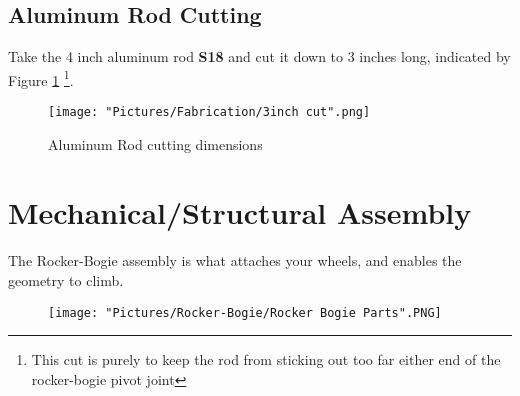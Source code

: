 \documentclass[12pt]{article}
\begin{document}
\subsection{Aluminum Rod Cutting}

Take the 4 inch aluminum rod \textbf{S18} and cut it down to 3 inches long, indicated by Figure \ref{rod cut} \footnote{This cut is purely to keep the rod from sticking out too far either end of the rocker-bogie pivot joint}.

\begin{figure}[H]
	\centering
	\texttt{[image: "Pictures/Fabrication/3inch cut".png]}
	\caption{Aluminum Rod cutting dimensions}
	\label{rod cut}
\end{figure}

\section{Mechanical/Structural Assembly}

The Rocker-Bogie assembly is what attaches your wheels, and enables the geometry to climb.

\begin{figure}[H]
	\centering
	\texttt{[image: "Pictures/Rocker-Bogie/Rocker Bogie Parts".PNG]}
\end{figure}
\end{document}
